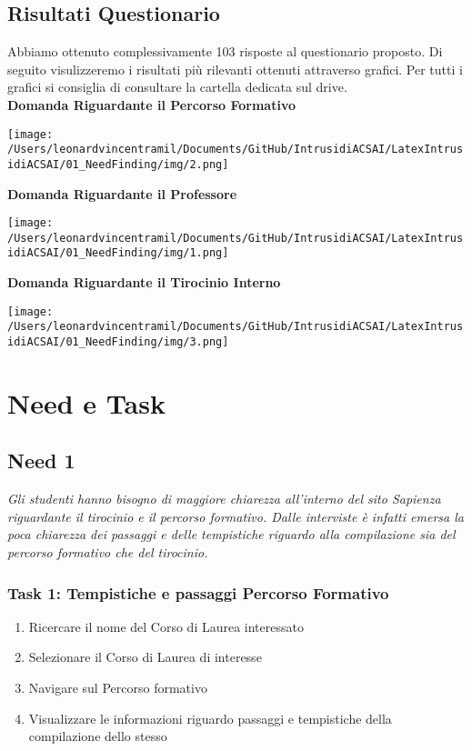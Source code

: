 \subsection{Risultati Questionario}
Abbiamo ottenuto complessivamente 103 risposte al questionario proposto.
Di seguito visulizzeremo i risultati più rilevanti ottenuti attraverso grafici. Per tutti i grafici si consiglia di consultare la cartella dedicata sul drive.\\

\textbf{Domanda Riguardante il Percorso Formativo}
\begin{center}
    \texttt{[image: /Users/leonardvincentramil/Documents/GitHub/IntrusidiACSAI/LatexIntrusidiACSAI/01\_NeedFinding/img/2.png]}
\end{center}

\textbf{Domanda Riguardante il Professore}
\begin{center}
    \texttt{[image: /Users/leonardvincentramil/Documents/GitHub/IntrusidiACSAI/LatexIntrusidiACSAI/01\_NeedFinding/img/1.png]}
\end{center}


\textbf{Domanda Riguardante il Tirocinio Interno}
\begin{center}
    \texttt{[image: /Users/leonardvincentramil/Documents/GitHub/IntrusidiACSAI/LatexIntrusidiACSAI/01\_NeedFinding/img/3.png]}
\end{center}

\section{Need e Task}
\subsection{Need 1}
\begin{center}
    \textit{Gli studenti hanno bisogno di maggiore chiarezza all'interno del sito Sapienza riguardante il tirocinio e il percorso formativo. Dalle interviste è infatti emersa la poca chiarezza dei passaggi e delle tempistiche riguardo alla compilazione sia del percorso formativo che del tirocinio.}
\end{center}
\subsubsection{Task 1: Tempistiche e passaggi Percorso Formativo}
\begin{enumerate}
    \item Ricercare il nome del Corso di Laurea interessato
    \item Selezionare il Corso di Laurea di interesse
    \item Navigare sul Percorso formativo
    \item Visualizzare le informazioni riguardo passaggi e tempistiche della compilazione dello stesso
\end{enumerate}

